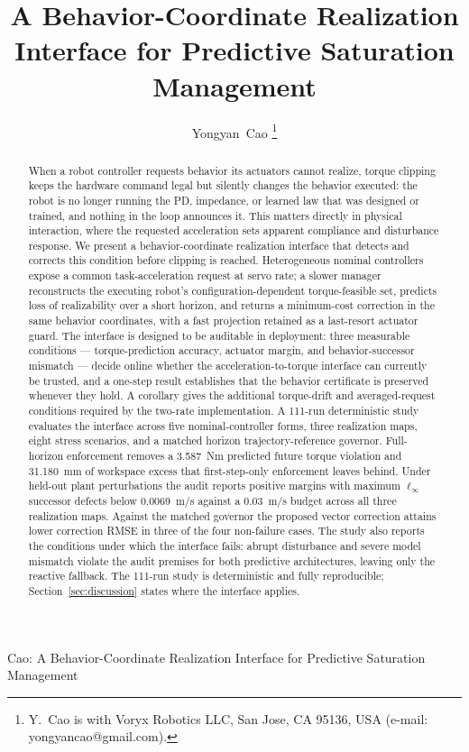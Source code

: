 \documentclass[journal]{IEEEtran}
\begin{document}
\title{A Behavior-Coordinate Realization Interface for Predictive Saturation Management}

\author{Yongyan~Cao %
\thanks{Y.~Cao is with Voryx Robotics LLC, San Jose, CA 95136, USA (e-mail: yongyancao@gmail.com).}%
}

%
{Cao: A Behavior-Coordinate Realization Interface for Predictive Saturation Management}

\maketitle

\begin{abstract}
When a robot controller requests behavior its actuators cannot realize, torque clipping keeps the
hardware command legal but silently changes the behavior executed: the robot is no longer running
the PD, impedance, or learned law that was designed or trained, and nothing in the loop announces
it. This matters directly in physical interaction, where the requested acceleration sets apparent
compliance and disturbance response. We present a behavior-coordinate realization interface that
detects and corrects this condition before clipping is reached. Heterogeneous nominal controllers
expose a common task-acceleration request at servo rate; a slower manager reconstructs the
executing robot's configuration-dependent torque-feasible set, predicts loss of realizability over
a short horizon, and returns a minimum-cost correction in the same behavior coordinates, with a
fast projection retained as a last-resort actuator guard. The interface is designed to be
auditable in deployment: three measurable conditions --- torque-prediction accuracy, actuator
margin, and behavior-successor mismatch --- decide online whether the acceleration-to-torque
interface can currently be trusted, and a one-step result establishes that the behavior
certificate is preserved whenever they hold. A corollary gives the additional torque-drift and
averaged-request conditions required by the two-rate implementation.
A 111-run deterministic study evaluates the interface across five nominal-controller forms, three
realization maps, eight stress scenarios, and a matched horizon trajectory-reference governor.
Full-horizon enforcement removes a 3.587~Nm predicted future torque violation and 31.180~mm of
workspace excess that first-step-only enforcement leaves behind. Under held-out plant
perturbations the audit reports positive margins with maximum $\ell_\infty$ successor defects
below 0.0069~m/s against a 0.03~m/s budget across all three realization maps. Against the matched
governor the proposed vector correction attains lower correction RMSE in three of the four
non-failure cases. The study also reports the conditions under which the interface fails:
abrupt disturbance and severe model mismatch violate the audit premises for both predictive
architectures, leaving only the reactive fallback. The 111-run study is deterministic and fully
reproducible; Section~\ref{sec:discussion} states where the interface applies.
\end{abstract}
\end{document}
